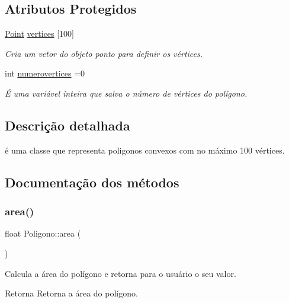 \subsection*{Atributos Protegidos}
\begin{DoxyCompactItemize}
\item 
\mbox{\hyperlink{class_point}{Point}} \mbox{\hyperlink{class_poligono_a18179d267bdf366f6bb00a4e1b16f1d7}{vertices}} \mbox{[}100\mbox{]}
\begin{DoxyCompactList}\small\item\em Cria um vetor do objeto ponto para definir os vértices. \end{DoxyCompactList}\item 
int \mbox{\hyperlink{class_poligono_adc59c72d363089aa8dc097e1f338875a}{numerovertices}} =0
\begin{DoxyCompactList}\small\item\em É uma variável inteira que salva o número de vértices do polígono. \end{DoxyCompactList}\end{DoxyCompactItemize}


\subsection{Descrição detalhada}
é uma classe que representa poligonos convexos com no máximo 100 vértices. 

\subsection{Documentação dos métodos}
\mbox{\label{class_poligono_a7f66c446f86c19118663ef1b2c8a4be6}} 
\subsubsection{\texorpdfstring{area()}{area()}}
{\footnotesize\ttfamily float Poligono\+::area (\begin{DoxyParamCaption}{ }\end{DoxyParamCaption})}



Calcula a área do polígono e retorna para o usuário o seu valor. 

\begin{DoxyReturn}{Retorna}
Retorna a área do polígono. 
\end{DoxyReturn}

